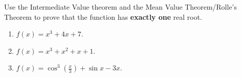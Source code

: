 Use the Intermediate Value theorem and the Mean Value Theorem/Rolle's Theorem to prove that the function has \textbf{exactly one} real root.
\begin{enumerate}[ref={\fcProblemRef}]
\item \label{problemIVTandMVTx^3+4x+7} $f(x)=x^3+4x+7$.
\item $f(x)= x^3 +x^2+x+1$.
\item \label{problemIVTandMVTcos3xdiv3+sinx-3x} $f(x)=\cos^3 \left({\frac{x}{3}}\right) +\sin x-  3x$.
\end{enumerate}
